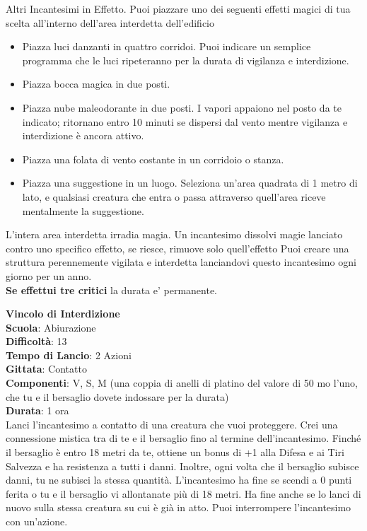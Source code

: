 \begin{multicols}{2}
Altri Incantesimi in Effetto. Puoi piazzare uno dei seguenti effetti magici di tua scelta all'interno dell'area interdetta dell'edificio
\medskip
\begin{itemize}
\item
Piazza luci danzanti in quattro corridoi. Puoi indicare un semplice programma che le luci ripeteranno per la durata di vigilanza e interdizione.
\item
Piazza bocca magica in due posti.
\item
Piazza nube maleodorante in due posti. I vapori appaiono nel posto da te indicato; ritornano entro 10 minuti se dispersi dal vento mentre vigilanza e interdizione è ancora attivo.
\item
Piazza una folata di vento costante in un corridoio o stanza.
\item
Piazza una suggestione in un luogo. Seleziona un'area quadrata di 1 metro di lato, e qualsiasi creatura che entra o passa attraverso quell'area riceve mentalmente la suggestione.
\end{itemize}
\medskip
L'intera area interdetta irradia magia. Un incantesimo dissolvi magie lanciato contro uno specifico effetto, se riesce, rimuove solo quell'effetto Puoi creare una struttura perennemente vigilata e interdetta lanciandovi questo incantesimo ogni giorno per un anno.\\
\textbf{Se effettui tre critici} la durata e' permanente.

\medskip\textbf{Vincolo di Interdizione}\\
\textbf{Scuola}: Abiurazione\\
\textbf{Difficoltà}: 13\\
\textbf{Tempo di Lancio}: 2 Azioni\\
\textbf{Gittata}: Contatto\\
\textbf{Componenti}: V, S, M (una coppia di anelli di platino del valore di 50 mo l'uno, che tu e il bersaglio dovete indossare per la durata)\\
\textbf{Durata}: 1 ora\\
Lanci l'incantesimo a contatto di una creatura che vuoi proteggere. Crei una connessione mistica tra di te e il bersaglio fino al termine dell'incantesimo. Finché il bersaglio è entro 18 metri da te, ottiene un bonus di +1 alla Difesa e ai Tiri Salvezza e ha resistenza a tutti i danni. Inoltre, ogni volta che il bersaglio subisce danni, tu ne subisci la stessa quantità. L'incantesimo ha fine se scendi a 0 punti ferita o tu e il bersaglio vi allontanate più di 18 metri. Ha fine anche se lo lanci di nuovo sulla stessa creatura su cui è già in atto. Puoi interrompere l'incantesimo con un'azione.


\end{multicols}
